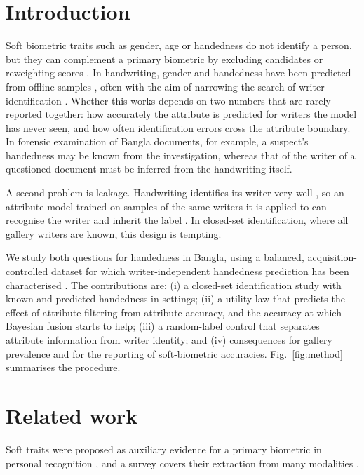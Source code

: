\documentclass[conference]{IEEEtran}
\begin{document}
\section{Introduction}
Soft biometric traits such as gender, age or handedness do not identify a person, but they can complement a primary biometric by excluding candidates or reweighting scores \cite{jain2004soft,dantcheva2016soft}. In handwriting, gender and handedness have been predicted from offline samples \cite{liwicki2011gender,siddiqi2015gender,hassaine2013icdar,bouadjenek2016soft,almaadeed2016handedness,morera2018handedness,rahmanian2021handedness}, often with the aim of narrowing the search of writer identification \cite{banglahand2026dataset}. Whether this works depends on two numbers that are rarely reported together: how accurately the attribute is predicted for writers the model has never seen, and how often identification errors cross the attribute boundary. In forensic examination of Bangla documents, for example, a suspect's handedness may be known from the investigation, whereas that of the writer of a questioned document must be inferred from the handwriting itself.

A second problem is leakage. Handwriting identifies its writer very well \cite{bulacu2007text,schomaker2007codebooks}, so an attribute model trained on samples of the same writers it is applied to can recognise the writer and inherit the label \cite{kaufman2012leakage}. In closed-set identification, where all gallery writers are known, this design is tempting.

We study both questions for handedness in Bangla, using a balanced, acquisition-controlled dataset \cite{banglahand2026dataset} for which writer-independent handedness prediction has been characterised \cite{anon2026handedness}. The contributions are: (i) a closed-set identification study with known and predicted handedness in \vnSettings{} settings; (ii) a utility law that predicts the effect of attribute filtering from attribute accuracy, and the accuracy at which Bayesian fusion starts to help; (iii) a random-label control that separates attribute information from writer identity; and (iv) consequences for gallery prevalence and for the reporting of soft-biometric accuracies. Fig.~\ref{fig:method} summarises the procedure.

\section{Related work}
\label{sec:related}
Soft traits were proposed as auxiliary evidence for a primary biometric in personal recognition \cite{jain2004soft}, and a survey covers their extraction from many modalities \cite{dantcheva2016soft}.
\end{document}
